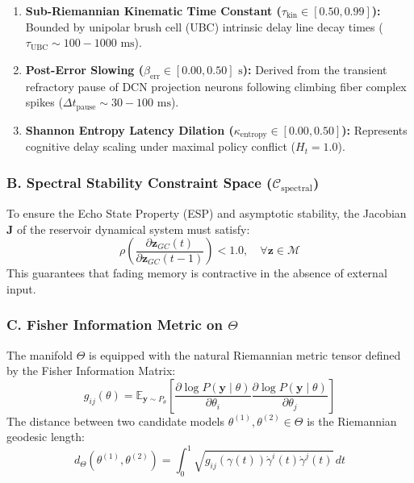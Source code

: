 \documentclass[11pt,twoside,a4paper]{article}
\begin{document}
\begin{enumerate}
    \item \textbf{Sub-Riemannian Kinematic Time Constant ($\tau_{\text{kin}} \in [0.50, 0.99]$):} Bounded by unipolar brush cell (UBC) intrinsic delay line decay times ($\tau_{\text{UBC}} \sim 100-1000\text{ ms}$).
    \item \textbf{Post-Error Slowing ($\beta_{\text{err}} \in [0.00, 0.50]\text{ s}$):} Derived from the transient refractory pause of DCN projection neurons following climbing fiber complex spikes ($\Delta t_{\text{pause}} \sim 30-100\text{ ms}$).
    \item \textbf{Shannon Entropy Latency Dilation ($\kappa_{\text{entropy}} \in [0.00, 0.50]$):} Represents cognitive delay scaling under maximal policy conflict ($H_t = 1.0$).
\end{enumerate}

\subsubsection{B. Spectral Stability Constraint Space ($\mathcal{C}_{\text{spectral}}$)}
To ensure the Echo State Property (ESP) and asymptotic stability, the Jacobian $\mathbf{J}$ of the reservoir dynamical system must satisfy:
\begin{equation}
\rho\left( \frac{\partial \mathbf{z}_{GC}(t)}{\partial \mathbf{z}_{GC}(t-1)} \right) < 1.0, \quad \forall \mathbf{z} \in \mathcal{M}
\end{equation}
This guarantees that fading memory is contractive in the absence of external input.

\subsubsection{C. Fisher Information Metric on $\Theta$}
The manifold $\Theta$ is equipped with the natural Riemannian metric tensor defined by the Fisher Information Matrix:
\begin{equation}
g_{ij}(\theta) = \mathbb{E}_{\mathbf{y} \sim P_\theta} \left[ \frac{\partial \log P(\mathbf{y} \mid \theta)}{\partial \theta_i} \frac{\partial \log P(\mathbf{y} \mid \theta)}{\partial \theta_j} \right]
\end{equation}
The distance between two candidate models $\theta^{(1)}, \theta^{(2)} \in \Theta$ is the Riemannian geodesic length:
\begin{equation}
d_{\Theta}(\theta^{(1)}, \theta^{(2)}) = \int_0^1 \sqrt{g_{ij}(\gamma(t)) \dot{\gamma}^i(t) \dot{\gamma}^j(t)}\, dt
\end{equation}
\end{document}
